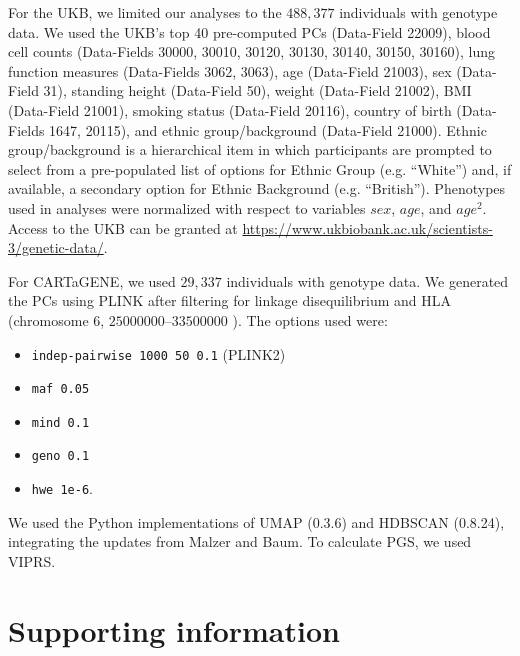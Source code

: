 For the UKB, we limited our analyses to the $488,377$ individuals with genotype data. We used the UKB's top 40 pre-computed PCs (Data-Field 22009), blood cell counts (Data-Fields 30000, 30010, 30120, 30130, 30140, 30150, 30160), lung function measures (Data-Fields 3062, 3063), age (Data-Field 21003), sex (Data-Field 31), standing height (Data-Field 50), weight (Data-Field 21002), BMI (Data-Field 21001), smoking status (Data-Field 20116), country of birth (Data-Fields 1647, 20115), and ethnic group/background (Data-Field 21000). Ethnic group/background is a hierarchical item in which participants are prompted to select from a pre-populated list of options for Ethnic Group (e.g. ``White'') and, if available, a secondary option for Ethnic Background (e.g. ``British''). Phenotypes used in analyses were normalized with respect to variables $sex$, $age$, and $age^2$. Access to the UKB can be granted at 
\url{https://www.ukbiobank.ac.uk/scientists-3/genetic-data/}.

For CARTaGENE, we used $29,337$ individuals with genotype data. We generated the PCs using PLINK\citep{purcell_plink_2007} after filtering for linkage disequilibrium and HLA (chromosome 6, $25000000\textbf{--}33500000$ ). The options used were:
\begin{itemize}
\item \verb|indep-pairwise 1000 50 0.1| (PLINK2)
\item \verb|maf 0.05|
\item \verb|mind 0.1|
\item \verb|geno 0.1|
\item \verb|hwe 1e-6|.
\end{itemize}

We used the Python implementations of UMAP\citep{mcinnes_umap_2020} (0.3.6) and HDBSCAN (0.8.24), integrating the updates from Malzer and Baum\citep{malzer_hybrid_2020}. To calculate PGS, we used VIPRS\citep{zabad_fast_2023}.

\section{Supporting information}

